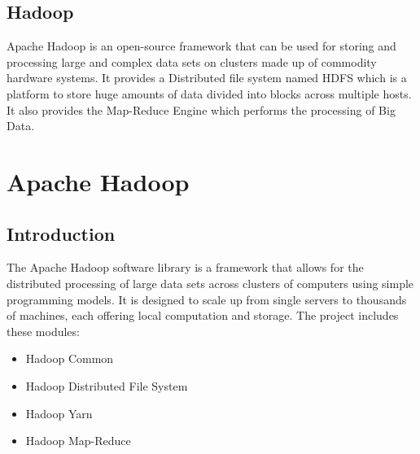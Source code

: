 \documentclass[12pt]{book}
\begin{document}
\section{Hadoop}
Apache Hadoop is an open-source framework that can be used for storing  and processing large and complex data sets on clusters made up of
commodity hardware systems. It provides a Distributed file system named HDFS which is a platform to store huge amounts of data  divided into 
blocks across multiple hosts. It also provides the Map-Reduce Engine which performs the processing of Big Data.
\\\noindent



\chapter{Apache Hadoop}
\section{Introduction}
The Apache Hadoop software library is a framework that allows for the distributed processing of large data sets across clusters of computers using simple programming models. It is designed to scale up from single servers to thousands of machines, each offering local computation and storage.
The project includes these modules: 
\begin{itemize}
 \item Hadoop Common
 \item Hadoop Distributed File System
 \item Hadoop Yarn
 \item Hadoop Map-Reduce
\end{itemize}
\end{document}
